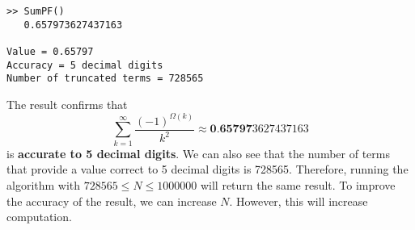 \documentclass[11pt]{report}
\begin{document}
\begin{lstlisting}[title={N=1000000}]
>> SumPF()
   0.657973627437163

Value = 0.65797
Accuracy = 5 decimal digits
Number of truncated terms = 728565
\end{lstlisting}
The result confirms that 
\begin{equation*}
	\sum_{k=1}^{\infty} \frac{(-1)^{\Omega(k)}}{k^2} \approx \textbf{0.65797}3627437163
\end{equation*}
is \textbf{accurate to 5 decimal digits}. We can also see that the number of terms that provide a value correct to 5 decimal digits is 728565. Therefore, running the algorithm with $728565 \leq N \leq 1000000$ will return the same result. To improve the accuracy of the result, we can increase $N$. However, this will increase computation.
\end{document}

